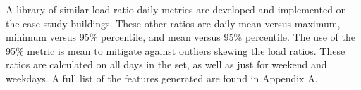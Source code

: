 A library of similar load ratio daily metrics are developed and implemented on the case study buildings. These other ratios are daily mean versus maximum, minimum versus 95\% percentile, and mean versus 95\% percentile. The use of the 95\% metric is mean to mitigate against outliers skewing the load ratios. These ratios are calculated on all days in the set, as well as just for weekend and weekdays. A full list of the features generated are found in Appendix A.